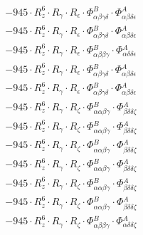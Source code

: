 \documentclass{article}
\begin{document}
\begin{subequations}
\begin{gather}
\begin{array}{c}
 \\[0.2em] 		 - 945 \cdot R_{z}^{6} \cdot R_{\gamma{}} \cdot R_{\epsilon{}} \cdot \Phi{}^{B}_{\alpha{}\beta{}\gamma{}\delta{}} \cdot \Phi{}^{A}_{\alpha{}\beta{}\delta{}\epsilon{}} 
 \\[0.2em] 		 - 945 \cdot R_{z}^{6} \cdot R_{\gamma{}} \cdot R_{\epsilon{}} \cdot \Phi{}^{B}_{\alpha{}\beta{}\gamma{}\delta{}} \cdot \Phi{}^{A}_{\alpha{}\beta{}\delta{}\epsilon{}} 
 \\[0.2em] 		 - 945 \cdot R_{z}^{6} \cdot R_{\gamma{}} \cdot R_{\epsilon{}} \cdot \Phi{}^{B}_{\alpha{}\beta{}\beta{}\gamma{}} \cdot \Phi{}^{A}_{\alpha{}\delta{}\delta{}\epsilon{}} 
 \\[0.2em] 		 - 945 \cdot R_{z}^{6} \cdot R_{\gamma{}} \cdot R_{\epsilon{}} \cdot \Phi{}^{B}_{\alpha{}\beta{}\gamma{}\delta{}} \cdot \Phi{}^{A}_{\alpha{}\beta{}\delta{}\epsilon{}} 
 \\[0.2em] 		 - 945 \cdot R_{z}^{6} \cdot R_{\gamma{}} \cdot R_{\epsilon{}} \cdot \Phi{}^{B}_{\alpha{}\beta{}\gamma{}\delta{}} \cdot \Phi{}^{A}_{\alpha{}\beta{}\delta{}\epsilon{}} 
 \\[0.2em] 		 - 945 \cdot R_{z}^{6} \cdot R_{\gamma{}} \cdot R_{\zeta{}} \cdot \Phi{}^{B}_{\alpha{}\alpha{}\beta{}\gamma{}} \cdot \Phi{}^{A}_{\beta{}\delta{}\delta{}\zeta{}} 
 \\[0.2em] 		 - 945 \cdot R_{z}^{6} \cdot R_{\gamma{}} \cdot R_{\zeta{}} \cdot \Phi{}^{B}_{\alpha{}\alpha{}\beta{}\gamma{}} \cdot \Phi{}^{A}_{\beta{}\delta{}\delta{}\zeta{}} 
 \\[0.2em] 		 - 945 \cdot R_{z}^{6} \cdot R_{\gamma{}} \cdot R_{\zeta{}} \cdot \Phi{}^{B}_{\alpha{}\alpha{}\beta{}\gamma{}} \cdot \Phi{}^{A}_{\beta{}\delta{}\delta{}\zeta{}} 
 \\[0.2em] 		 - 945 \cdot R_{z}^{6} \cdot R_{\gamma{}} \cdot R_{\zeta{}} \cdot \Phi{}^{B}_{\alpha{}\alpha{}\beta{}\gamma{}} \cdot \Phi{}^{A}_{\beta{}\delta{}\delta{}\zeta{}} 
 \\[0.2em] 		 - 945 \cdot R_{z}^{6} \cdot R_{\gamma{}} \cdot R_{\zeta{}} \cdot \Phi{}^{B}_{\alpha{}\alpha{}\beta{}\gamma{}} \cdot \Phi{}^{A}_{\beta{}\delta{}\delta{}\zeta{}} 
 \\[0.2em] 		 - 945 \cdot R_{z}^{6} \cdot R_{\gamma{}} \cdot R_{\zeta{}} \cdot \Phi{}^{B}_{\alpha{}\alpha{}\beta{}\gamma{}} \cdot \Phi{}^{A}_{\beta{}\delta{}\delta{}\zeta{}} 
 \\[0.2em] 		 - 945 \cdot R_{z}^{6} \cdot R_{\gamma{}} \cdot R_{\zeta{}} \cdot \Phi{}^{B}_{\alpha{}\beta{}\beta{}\gamma{}} \cdot \Phi{}^{A}_{\alpha{}\delta{}\delta{}\zeta{}} 

\end{array}
\end{gather}
\end{subequations}
\end{document}
